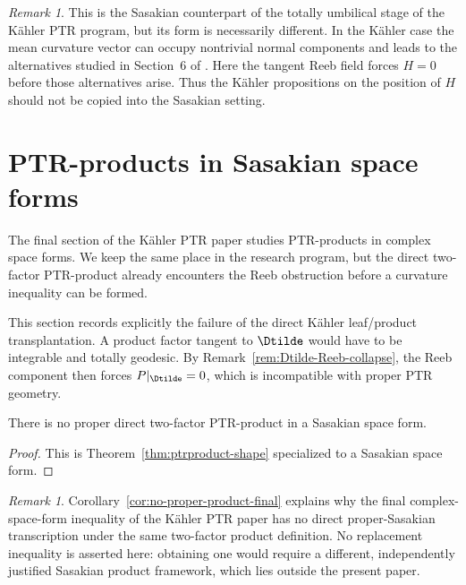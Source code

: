 \documentclass[11pt]{article}
\theoremstyle{definition}\newtheorem{definition}[theorem]{Definition}\newtheorem{example}[theorem]{Example}
\theoremstyle{remark}\newtheorem{remark}[theorem]{Remark}
\begin{document}
\begin{remark}\label{rem:umbilical-kahler}
This is the Sasakian counterpart of the totally umbilical stage of the
K\"ahler PTR program, but its form is necessarily different.  In the
K\"ahler case the mean curvature vector can occupy nontrivial normal
components and leads to the alternatives studied in Section~6 of
\cite{PoyrazSahinYerlikaya2025}.  Here the tangent Reeb field forces
\(H=0\) before those alternatives arise.  Thus the K\"ahler propositions
on the position of \(H\) should not be copied into the Sasakian setting.
\end{remark}

\section{PTR-products in Sasakian space forms}

The final section of the K\"ahler PTR paper studies PTR-products in
complex space forms.  We keep the same place in the research program, but
the direct two-factor PTR-product already encounters the Reeb obstruction
before a curvature inequality can be formed.

This section records explicitly the failure of the direct K\"ahler
leaf/product transplantation.  A product factor tangent to \(\Dtilde\)
would have to be integrable and totally geodesic.  By
Remark~\ref{rem:Dtilde-Reeb-collapse}, the Reeb component then forces
\(P|_{\Dtilde}=0\), which is incompatible with proper PTR geometry.

\begin{corollary}\label{cor:no-proper-product-final}
There is no proper direct two-factor PTR-product in a Sasakian space form.
\end{corollary}
\begin{proof}
This is Theorem~\ref{thm:ptrproduct-shape} specialized to a Sasakian
space form.
\end{proof}



\begin{remark}\label{rem:product-kahler}
Corollary~\ref{cor:no-proper-product-final} explains why the final
complex-space-form inequality of the K\"ahler PTR paper has no direct
proper-Sasakian transcription under the same two-factor product
definition.  No replacement inequality is asserted here: obtaining one
would require a different, independently justified Sasakian product
framework, which lies outside the present paper.
\end{remark}
\end{document}
